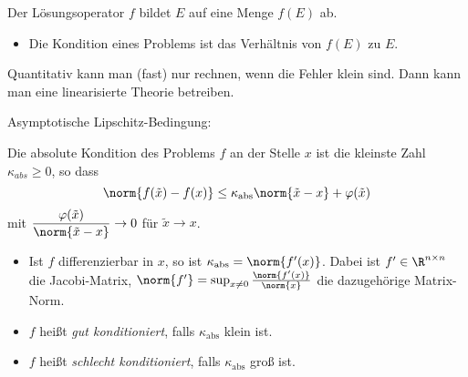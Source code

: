 Der Lösungsoperator $f$ bildet $E$ auf eine Menge $f(E)$ ab.
\begin{itemize}
\item Die Kondition eines Problems ist das \glqq Verhältnis von $f(E)$ zu $E$\grqq.
\end{itemize}

\bigskip

Quantitativ kann man (fast) nur rechnen, wenn die Fehler klein sind.
Dann kann man eine linearisierte Theorie betreiben.

\medskip

Asymptotische Lipschitz-Bedingung:
\begin{definition}
Die absolute Kondition des Problems $f$ an der Stelle $x$ ist die kleinste Zahl $\kappa_{abs} \ge 0$, so dass
\begin{equation*}
\norm{f(\tilde{x}) - f(x)} \le \kappa_\text{abs} \norm{\tilde{x} - x} + \varphi(\tilde{x})
\end{equation*}
mit $\displaystyle \frac{\varphi(\tilde{x})}{\norm{\tilde{x} - x}} \to 0$ für $\tilde{x} \to x$.
\end{definition}

\begin{itemize}
\item Ist $f$ differenzierbar in $x$, so ist $\kappa_\text{abs} = \norm{f'(x)}$. Dabei ist $f' \in \R^{n \times n}$ die Jacobi-Matrix, $\norm{f'} = \sup_{x \neq 0}\frac{\norm{f'(x)}}{\norm{x}}$ die dazugehörige Matrix-Norm.
\item $f$ heißt \emph{gut konditioniert}, falls $\kappa_\text{abs}$ \glqq klein\grqq{} ist.
\item $f$ heißt \emph{schlecht konditioniert}, falls $\kappa_\text{abs}$ \glqq groß\grqq{} ist.
\end{itemize}

